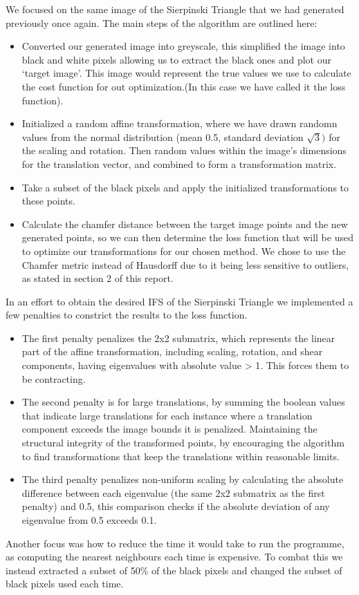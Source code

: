 \documentclass[a4paper,11pt, titlepage]{article}
\theoremstyle{definition}
\theoremstyle{plain}
\theoremstyle{remark}
\theoremstyle{definition}
\begin{document}
We focused on the same image of the Sierpinski Triangle that we had generated previously once again. The main steps of the algorithm are outlined here:
\begin{itemize}
    \item Converted our generated image into greyscale, this simplified the image into black and white pixels allowing us to extract the black ones and plot our ‘target image’. This image would represent the true values we use to calculate the cost function for out optimization.(In this case we have called it the loss function).
    \item Initialized a random affine transformation, where we have drawn randomn values from the normal distribution (mean 0.5, standard deviation $\sqrt{3})$ for the scaling and rotation. Then random values within the image’s dimensions for the translation vector, and combined to form a transformation matrix. 
    \item Take a subset of the black pixels and apply the initialized transformations to these points. 
    \item Calculate the chamfer distance between the target image points and the new generated points, so we can then determine the loss function that will be used to optimize our transformations for our chosen method. We chose to use the Chamfer metric instead of Hausdorff due to it being less sensitive to outliers, as stated in section 2 of this report.  
    
\end{itemize}

In an effort to obtain the desired IFS of the Sierpinski Triangle we implemented a few penalties to constrict the results to the loss function. 
\begin{itemize}
    \item The first penalty  penalizes the 2x2 submatrix, which represents the linear part of the affine transformation, including scaling, rotation, and shear components, having eigenvalues with absolute value > 1. This forces them to be contracting. 
    \item The second penalty is for large translations, by summing the boolean values that indicate large translations for each instance where a translation component exceeds the image bounds it is penalized. Maintaining the structural integrity of the transformed points, by encouraging the algorithm to find transformations that keep the translations within reasonable limits. 
    \item The third penalty penalizes non-uniform scaling by calculating the absolute difference between each eigenvalue (the same 2x2 submatrix as the first penalty) and 0.5, this comparison checks if the absolute deviation of any eigenvalue from 0.5 exceeds 0.1. 
\end{itemize}
Another focus was how to reduce the time it would take to run the programme, as computing the nearest neighbours each time is expensive. To combat this we instead extracted a subset of 50\% of the black pixels and changed the subset of black pixels used each time. 
\end{document}
